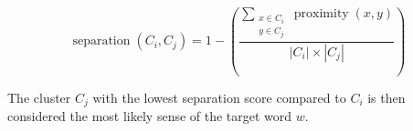 \begin{equation}
 \operatorname{separation}(C_i,C_j) =
 1 - \left(
 \frac {\sum_{\substack{x \in C_i \\ y \in C_j}} \operatorname{proximity}(x,y)}
       {|C_i| \times |C_j|}
 \right)
\label{eq:separation}
\end{equation}

The cluster $C_j$ with the lowest separation score compared to $C_i$ is then
considered the most likely sense of the target word $w$.


